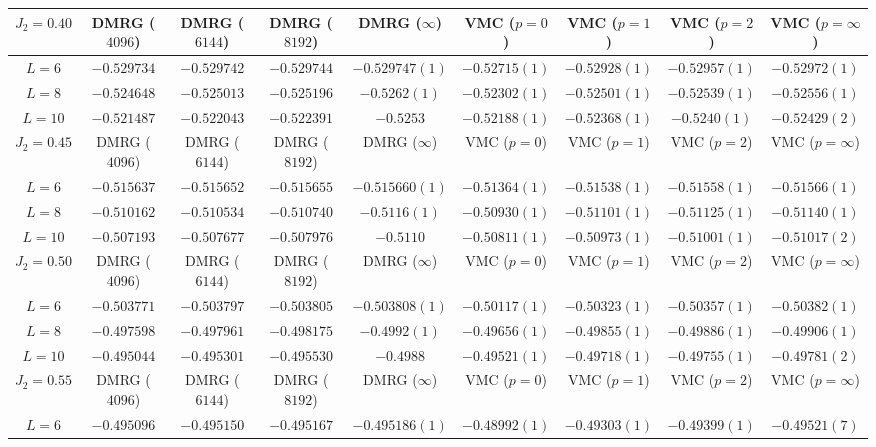\documentclass[prl,aps,epsf,showpacs,twocolumn]{revtex4}
\begin{document}
\begin{appendices}
\begin{table}
\begin{tabular}{|c|c|c|c|c|c|c|c|c|}
\hline
$J_2=0.40$ & DMRG ($4096$) & DMRG ($6144$) & DMRG ($8192$) & DMRG ($\infty$) & VMC ($p=0$) & VMC ($p=1$) & VMC ($p=2$) & VMC ($p=\infty$)\\
\hline
$L=6$ & $-0.529734$  & $-0.529742$ & $-0.529744$ & $-0.529747(1)$ & $-0.52715(1)$ & $-0.52928(1)$ & $-0.52957(1)$ & $-0.52972(1)$ \\
\hline
$L=8$ & $-0.524648$ & $-0.525013$ & $-0.525196$ & $-0.5262(1)$ & $-0.52302(1)$ & $-0.52501(1)$ & $-0.52539(1)$ & $-0.52556(1)$\\
\hline
$L=10$ & $-0.521487$ & $-0.522043$ & $-0.522391$ & $-0.5253$ & $-0.52188(1)$ & $-0.52368(1)$ & $-0.5240(1)$ & $-0.52429(2)$  \\
\hline
\hline
$J_2=0.45$ & DMRG ($4096$) & DMRG ($6144$) & DMRG ($8192$) & DMRG ($\infty$) & VMC ($p=0$) & VMC ($p=1$) & VMC ($p=2$) & VMC ($p=\infty$)\\
\hline
$L=6$ & $-0.515637$  & $-0.515652$ & $-0.515655$ & $-0.515660(1)$ & $-0.51364(1)$ & $-0.51538(1)$ & $-0.51558(1)$ & $-0.51566(1)$ \\
\hline
$L=8$ & $-0.510162$ & $-0.510534$ & $-0.510740$ & $-0.5116(1)$ & $-0.50930(1)$ & $-0.51101(1)$ & $-0.51125(1)$ & $-0.51140(1)$\\
\hline
$L=10$ & $-0.507193$ & $-0.507677$ & $-0.507976$ & $-0.5110$ & $-0.50811(1)$ & $-0.50973(1)$ & $-0.51001(1)$ & $-0.51017(2)$  \\
\hline
\hline
$J_2=0.50$ & DMRG ($4096$) & DMRG ($6144$) & DMRG ($8192$) & DMRG ($\infty$) & VMC ($p=0$) & VMC ($p=1$) & VMC ($p=2$) & VMC ($p=\infty$)\\
\hline
$L=6$ & $-0.503771$  & $-0.503797$ & $-0.503805$ & $-0.503808(1)$ & $-0.50117(1)$ & $-0.50323(1)$ & $-0.50357(1)$ & $-0.50382(1)$ \\
\hline
$L=8$ & $-0.497598$ & $-0.497961$ & $-0.498175$ & $-0.4992(1)$ & $-0.49656(1)$ & $-0.49855(1)$ & $-0.49886(1)$ & $-0.49906(1)$\\
\hline
$L=10$ & $-0.495044$ & $-0.495301$ & $-0.495530$ & $-0.4988$ & $-0.49521(1)$ & $-0.49718(1)$ & $-0.49755(1)$ & $-0.49781(2)$  \\
\hline
\hline
$J_2=0.55$ & DMRG ($4096$) & DMRG ($6144$) & DMRG ($8192$) & DMRG ($\infty$) & VMC ($p=0$) & VMC ($p=1$) & VMC ($p=2$) & VMC ($p=\infty$)\\
\hline
$L=6$ & $-0.495096$ & $-0.495150$ & $-0.495167$ & $-0.495186(1)$ & $-0.48992(1)$ & $-0.49303(1)$ & $-0.49399(1)$ & $-0.49521(7)$\\

\end{tabular}
\end{table}
\end{appendices}
\end{document}
